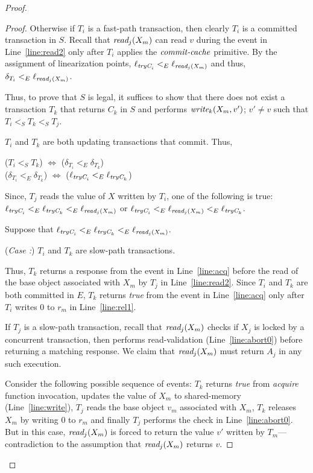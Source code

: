\begin{proof}
\begin{proof}
Otherwise if $T_i$ is a fast-path transaction, then clearly $T_i$ is a committed transaction in $S$.
Recall that $\textit{read}_j(X_m)$ can read $v$ during the event in Line~\ref{line:read2}
only after $T_i$ applies the $\ms{commit-cache}$ primitive.
By the assignment of linearization points, 
$\ell_{\textit{tryC}_i} <_E \ell_{\textit{read}_j(X_m)}$ and thus, $\delta_{T_{i}} <_E \ell_{\textit{read}_j(X_m)}$.

Thus, to prove that $S$ is legal, it suffices to show that  
there does not exist a
transaction $T_k$ that returns $C_k$ in $S$ and performs $\textit{write}_k(X_m,v')$; $v'\neq v$ such that $T_i <_S T_k <_S T_j$. 
%

$T_i$ and $T_k$ are both updating transactions that commit. Thus, 
%
\begin{center}
($T_i <_S T_k$) $\Longleftrightarrow$ ($\delta_{T_i} <_{E} \delta_{T_k}$) \\
($\delta_{T_i} <_{E} \delta_{T_k}$) $\Longleftrightarrow$ ($\ell_{\textit{tryC}_i} <_{E} \ell_{\textit{tryC}_k}$) 
\end{center}
%
Since, $T_j$ reads the value of $X$ written by $T_i$, one of the following is true:
$\ell_{\textit{tryC}_i} <_{E} \ell_{\textit{tryC}_k} <_{E} \ell_{\textit{read}_j(X_m)}$ or
$\ell_{\textit{tryC}_i} <_{E} \ell_{\textit{read}_j(X_m)} <_{E} \ell_{\textit{tryC}_k}$.

Suppose that $\ell_{\textit{tryC}_i} <_{E} \ell_{\textit{tryC}_k} <_{E} \ell_{\textit{read}_j(X_m)}$.

(\textit{Case :}) $T_i$ and $T_k$ are slow-path transactions.

Thus, $T_k$ returns a response from the event in Line~\ref{line:acq} 
before the read of the base object associated with $X_m$ by $T_j$ in Line~\ref{line:read2}. 
Since $T_i$ and $T_k$ are both committed in $E$, $T_k$ returns \emph{true} from the event in
Line~\ref{line:acq} only after $T_i$ writes $0$ to $r_{m}$ in Line~\ref{line:rel1}.

If $T_j$ is a slow-path transaction, 
recall that $\textit{read}_j(X_m)$ checks if $X_j$ is locked by a concurrent transaction, 
then performs read-validation (Line~\ref{line:abort0}) before returning a matching response. 
We claim that $\textit{read}_j(X_m)$ must return $A_j$ in any such execution.

Consider the following possible sequence of events: 
$T_k$ returns \emph{true} from \emph{acquire} function invocation, 
updates the value of $X_m$ to shared-memory (Line~\ref{line:write}), 
$T_j$ reads the base object $v_m$ associated with $X_m$, 
$T_k$ releases $X_m$ by writing $0$ to $r_{m}$ and finally $T_j$ performs the check in Line~\ref{line:abort0}. 
But in this case, $\textit{read}_j(X_m)$ is forced to return the value $v'$ written by $T_m$--- 
contradiction to the assumption that $\textit{read}_j(X_m)$ returns $v$. 


\end{proof}
\end{proof}
